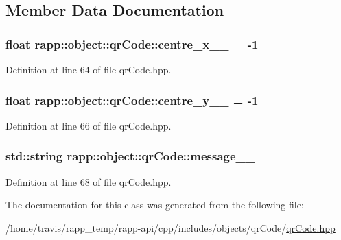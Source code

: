 \subsection{Member Data Documentation}
\hypertarget{classrapp_1_1object_1_1qrCode_a731e64161861c6dbcd83729564bf04c7}{
\subsubsection[{centre\-\_\-x\-\_\-\-\_\-}]{\setlength{\rightskip}{0pt plus 5cm}float rapp\-::object\-::qr\-Code\-::centre\-\_\-x\-\_\-\-\_\- = -\/1\hspace{0.3cm}{\ttfamily [private]}}}\label{classrapp_1_1object_1_1qrCode_a731e64161861c6dbcd83729564bf04c7}


Definition at line 64 of file qr\-Code.\-hpp.

\hypertarget{classrapp_1_1object_1_1qrCode_ae6d1a8dcfd971d39405f11566613f4ec}{
\subsubsection[{centre\-\_\-y\-\_\-\-\_\-}]{\setlength{\rightskip}{0pt plus 5cm}float rapp\-::object\-::qr\-Code\-::centre\-\_\-y\-\_\-\-\_\- = -\/1\hspace{0.3cm}{\ttfamily [private]}}}\label{classrapp_1_1object_1_1qrCode_ae6d1a8dcfd971d39405f11566613f4ec}


Definition at line 66 of file qr\-Code.\-hpp.

\hypertarget{classrapp_1_1object_1_1qrCode_a890dfabeb0190571784cea1df0ca36b7}{
\subsubsection[{message\-\_\-\-\_\-}]{\setlength{\rightskip}{0pt plus 5cm}std\-::string rapp\-::object\-::qr\-Code\-::message\-\_\-\-\_\-\hspace{0.3cm}{\ttfamily [private]}}}\label{classrapp_1_1object_1_1qrCode_a890dfabeb0190571784cea1df0ca36b7}


Definition at line 68 of file qr\-Code.\-hpp.



The documentation for this class was generated from the following file\-:\begin{DoxyCompactItemize}
\item 
/home/travis/rapp\-\_\-temp/rapp-\/api/cpp/includes/objects/qr\-Code/\hyperlink{qrCode_8hpp}{qr\-Code.\-hpp}\end{DoxyCompactItemize}
